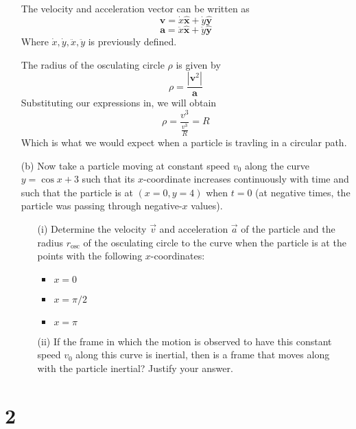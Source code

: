\documentclass[12pt]{article}
\newcommand{\abso}[1]{\left|#1 \right|}
\newcommand{\unx}{\hat{\mathbf{x}}}
\newcommand{\uny}{\hat{\mathbf{y}}}
\begin{document}
\begin{enumerate}
    The velocity and acceleration vector can be written as
    \[
    \mathbf{v} = \dot{x}\unx + \dot{y}\uny
    \]
    \[
    \mathbf{a} = \ddot{x}\unx + \ddot{y}\uny
    \]
    Where $\dot{x},\dot{y}, \ddot{x},\ddot{y}$ is previously defined. 
    
    The radius of the osculating circle $\rho$ is given by
    \[
    \rho = \frac{\abso{\mathbf{v}^2}}{\mathbf{a}}
    \]
    Substituting our expressions in, we will obtain
    \[
    \rho = \frac{v^3}{\frac{v^3}{R}} = R
    \]
    Which is what we would expect when a particle is travling in a circular path. 
    
    \item[(b)] Now take a particle moving at constant speed \( v_0 \) along the curve \( y = \cos x + 3 \) such that its \(x\)-coordinate increases continuously with time and such that the particle is at \( (x = 0, y = 4) \) when \( t = 0 \) (at negative times, the particle was passing through negative-\(x\) values).

    \begin{enumerate}
        \item[(i)] Determine the velocity \( \vec{v} \) and acceleration \( \vec{a} \) of the particle and the radius \( r_{\text{osc}} \) of the osculating circle to the curve when the particle is at the points with the following \(x\)-coordinates:
        \begin{itemize}
            \item \( x = 0 \)
            \item \( x = \pi/2 \)
            \item \( x = \pi \)
        \end{itemize}

        \item[(ii)] If the frame in which the motion is observed to have this constant speed \( v_0 \) along this curve is inertial, then is a frame that moves along with the particle inertial? Justify your answer.
    \end{enumerate}
\end{enumerate}
\section{2}
\end{document}
